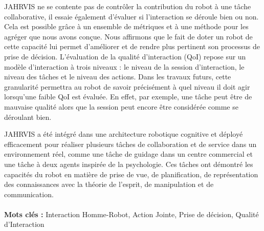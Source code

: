 \documentclass[english,a4paper,11pt,twoside]{StyleThese}
\begin{document}
JAHRVIS ne se contente pas de contrôler la contribution du robot à une tâche collaborative, il essaie également d'évaluer si l'interaction se déroule bien ou non. Cela est possible grâce à un ensemble de métriques et à une méthode pour les agréger que nous avons conçue. Nous affirmons que le fait de doter un robot de cette capacité lui permet d'améliorer et de rendre plus pertinent son processus de prise de décision. L'évaluation de la qualité d’interaction (QoI) repose sur un modèle d'interaction à trois niveaux : le niveau de la session d'interaction, le niveau des tâches et le niveau des actions. Dans les travaux futurs, cette granularité permettra au robot de savoir précisément à quel niveau il doit agir lorsqu'une faible QoI est évaluée. En effet, par exemple, une tâche peut être de mauvaise qualité alors que la session peut encore être considérée comme se déroulant bien.


JAHRVIS a été intégré dans une architecture robotique cognitive et déployé efficacement pour réaliser plusieurs tâches de collaboration et de service dans un environnement réel, comme une tâche de guidage dans un centre commercial et une tâche à deux agents inspirée de la psychologie. Ces tâches ont démontré les capacités du robot en matière de prise de vue, de planification, de représentation des connaissances avec la théorie de l'esprit, de manipulation et de communication.
\\
\\
\textbf{Mots clés :} Interaction Homme-Robot, Action Jointe, Prise de décision, Qualité d'Interaction

%
%

\iftoggle{ThesisInEnglish}{%
\chapter*{Acknowledgments}
}{%
\chapter*{Remerciements}
}
\end{document}
